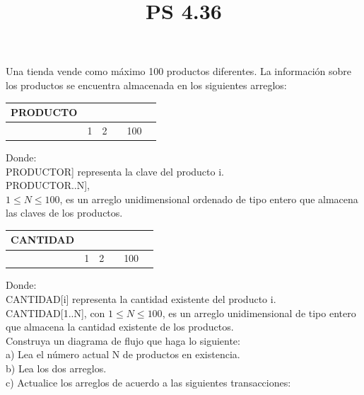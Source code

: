 \documentclass[11pt]{amsart}
\title{PS 4.36}
\begin{document}
\maketitle
\noindent  Una tienda vende como máximo 100 productos diferentes. La información sobre los productos se encuentra almacenada en los siguientes arreglos:\\



\begin{center}
\begin{tabular}{c|c|c|c|c|c|}
\hline
  PRODUCTO &&&& \\
\hline
  &1&2&&100
\end{tabular}
\end{center}

Donde:\\

\noindent PRODUCTOR] representa la clave del producto i.\\
PRODUCTOR..N],\\
$1 \leq N \leq 100$, es un arreglo unidimensional ordenado de tipo entero que almacena las claves de los productos.

\begin{center}
\begin{tabular}{c|c|c|c|c|c|}
\hline
  CANTIDAD &&&& \\
\hline
  &1&2&&100
\end{tabular}
\end{center}

\noindent Donde:\\

\noindent CANTIDAD[i] representa la cantidad existente del producto i.\\

\noindent CANTIDAD[1..N], con $1 \leq N \leq 100$, es un arreglo unidimensional de tipo entero que almacena la cantidad existente de los productos.\\


\noindent Construya un diagrama de flujo que haga lo siguiente:\\


\noindent a) Lea el número actual N de productos en existencia.\\
b) Lea los dos arreglos.\\
c) Actualice los arreglos de acuerdo a las siguientes transacciones:\\
\end{document}
